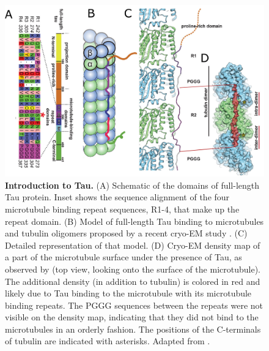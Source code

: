 \begin{figure}[h!tb]
\centering
\includegraphics[width=\linewidth]{Figures/Tau.png}
\caption[Introduction to Tau.]{\textbf{Introduction to Tau.}
(A) Schematic of the domains of full-length Tau protein. Inset shows the sequence alignment of the four microtubule binding repeat sequences, R1-4, that make up the repeat domain. (B) Model of full-length Tau binding to microtubules and tubulin oligomers proposed by a recent cryo-EM study \parencite{Kellogg2018}. (C) Detailed representation of that model. (D) Cryo-EM density map of a part of the microtubule surface under the presence of Tau, as observed by \cite{Kellogg2018} (top view, looking onto the surface of the microtubule). The additional density (in addition to tubulin) is colored in red and likely due to Tau binding to the microtubule with its microtubule binding repeats. The PGGG sequences between the repeats were not visible on the density map, indicating that they did not bind to the microtubules in an orderly fashion. The positions of the C-terminals of tubulin are indicated with asterisks. Adapted from \cite{Kellogg2018}. 
	}\label{Tau}
\end{figure}

